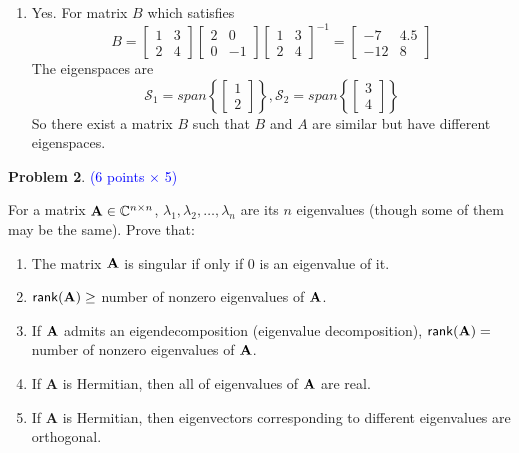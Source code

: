 \documentclass[english,onecolumn]{IEEEtran}
\newcommand{\bA}{{\bf A}}
\def\A{\mathbf{A}}
\begin{document}
\begin{enumerate}
    \item Yes. For matrix $B$ which satisfies
    $$B = \begin{bmatrix}
    	1 & 3\\
    	2 & 4
    \end{bmatrix}\begin{bmatrix}
    	2 & 0\\
    	0 & -1
    \end{bmatrix}\begin{bmatrix}
    	1 & 3\\
    	2 & 4
    \end{bmatrix}^{-1} = \begin{bmatrix}
    	-7 & 4.5\\
    	-12 & 8
    \end{bmatrix}$$
    The eigenspaces are 
    $$\mathcal{S}_1 = span\left\{\begin{bmatrix}
    	1\\2
    \end{bmatrix}\right\}, \mathcal{S}_2 = span\left\{\begin{bmatrix}
    	3\\4
    \end{bmatrix}\right\}$$
    So there exist a matrix $B$ such that $B$ and $A$ are similar but have different eigenspaces.
\end{enumerate}


\newpage
\noindent\textbf{Problem 2}. \textcolor{blue}{(6 points $\times$ 5)}

\noindent
For a matrix ${\bf A}\in \mathbb{C}^{n\times n}$, 
$\lambda_1, \lambda_2, \ldots, \lambda_n$   are its $n$ eigenvalues 
(though some of them may be the same). 
Prove that:
\begin{enumerate}
    \item The matrix ${\bf A}$ is singular if only if 0 is an eigenvalue of it.
    \item ${\sf rank}({\bf A}) \geq$ number of nonzero eigenvalues of ${\bf A}$.
    \item If ${\bf A}$ admits an  eigendecomposition (eigenvalue decomposition), ${\sf rank}({\bf A}) =$ number of nonzero eigenvalues of ${\bf A}$.
    \item If $\A$ is Hermitian, then all of eigenvalues of $\bA$ are real.
    \item If $\A$ is Hermitian, then eigenvectors corresponding to different eigenvalues are orthogonal.
\end{enumerate}
\end{document}
